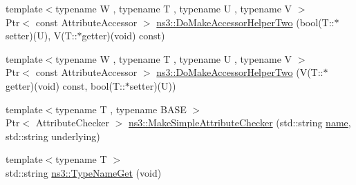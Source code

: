 \begin{DoxyCompactItemize}
\item 
{\footnotesize template$<$typename W , typename T , typename U , typename V $>$ }\\Ptr$<$ const Attribute\+Accessor $>$ \hyperlink{group__attributeimpl_ga2dd52d53891974b5e2454e1c5646f79f}{ns3\+::\+Do\+Make\+Accessor\+Helper\+Two} (bool(T\+::$\ast$setter)(U), V(T\+::$\ast$getter)(void) const)
\item 
{\footnotesize template$<$typename W , typename T , typename U , typename V $>$ }\\Ptr$<$ const Attribute\+Accessor $>$ \hyperlink{group__attributeimpl_ga157002a9f8cf399e6a2576a3b03f2252}{ns3\+::\+Do\+Make\+Accessor\+Helper\+Two} (V(T\+::$\ast$getter)(void) const, bool(T\+::$\ast$setter)(U))
\item 
{\footnotesize template$<$typename T , typename B\+A\+SE $>$ }\\Ptr$<$ Attribute\+Checker $>$ \hyperlink{group__attributeimpl_gabb1f14e9bbd7c4eda14c8a794a9b29ad}{ns3\+::\+Make\+Simple\+Attribute\+Checker} (std\+::string \hyperlink{generate__test__data__lte__spectrum__model_8m_ab74e6bf80237ddc4109968cedc58c151}{name}, std\+::string underlying)
\item 
{\footnotesize template$<$typename T $>$ }\\std\+::string \hyperlink{group__attributeimpl_gaa575643602994c3f6c7e580fcd5ef041}{ns3\+::\+Type\+Name\+Get} (void)
\end{DoxyCompactItemize}
